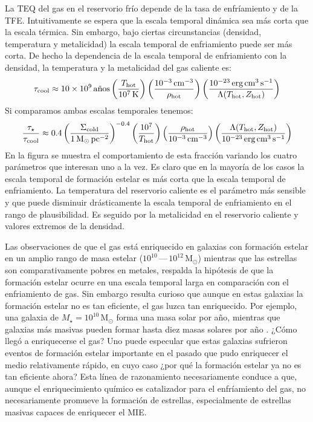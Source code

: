 \documentclass{article}
\begin{document}
\begin{description}
La TEQ del gas en el reservorio frío depende de la tasa de enfríamiento y de la TFE. Intuitivamente
se espera que la escala temporal dinámica sea más corta que la escala térmica. Sin embargo, bajo
ciertas circunstancias (densidad, temperatura y metalicidad) la escala temporal de enfriamiento
puede ser más corta.
De hecho la dependencia de la escala temporal de enfriamiento con la densidad, la temperatura y la
metalicidad del gas caliente es:
%
\begin{equation}
\tau_\text{cool}\approx10\times10^9\,\text{años}\left(\frac{T_\text{hot}}{10^7\,\text{K}}\right)\left(\frac{10^{-3}\,\text{cm}^{-3}}{\rho_\text{hot}}\right)\left(\frac{10^{-23}\,\text{erg\,cm}^{3}\,\text{s}^{-1}}{\Lambda(T_\text{hot},Z_\text{hot})}\right)
\end{equation}
%
Si comparamos ambas escalas temporales tenemos:
%
\begin{equation*}
\frac{\tau_\star}{\tau_\text{cool}} \approx 0.4\left(\frac{\Sigma_\text{cold}}{1\,\text{M}_\odot\,\text{pc}^{-2}}\right)^{-0.4}\left(\frac{10^7}{T_\text{hot}}\right)\left(\frac{\rho_\text{hot}}{10^{-3}\,\text{cm}^{-3}}\right)\left(\frac{\Lambda(T_\text{hot},Z_\text{hot})}{10^{-23}\,\text{erg\,cm}^{3}\,\text{s}^{-1}}\right)
\end{equation*}
%
En la figura se muestra el comportamiento de esta fracción variando los cuatro parámetros que
interesan uno a la vez. Es claro que en la mayoría de los casos la escala temporal de formación
estelar es más corta que la escala temporal de enfriamiento. La temperatura del reservorio caliente
es el parámetro más sensible y que puede disminuir drásticamente la escala temporal de enfriamiento
en el rango de plausibilidad. Es seguido por la metalicidad en el reservorio caliente y valores
extremos de la densidad.

Las observaciones de que el gas está enriquecido en galaxias con formación estelar en un amplio
rango de masa estelar ($10^{10}\,$---$\,10^{12}\,\text{M}_\odot$)
mientras que las estrellas son comparativamente pobres en metales, respalda la hipótesis de que la
formación estelar ocurre en una escala temporal larga en comparación con el enfriamiento de gas. Sin
embargo resulta curioso que aunque en estas galaxias la formación estelar no es tan eficiente, el
gas luzca tan enriquecido. Por ejemplo, una galaxia de $M_\star=10^{10}\,\text{M}_\odot$ forma una
masa solar por año, mientras que galaxias más masivas pueden formar hasta diez masas solares por año
\citep{Sanchez2013}. ¿Cómo llegó a enriquecerse el gas? Uno puede especular que estas galaxias
sufrieron eventos de formación estelar importante en el pasado que pudo enriquecer el medio
relativamente rápido, en cuyo caso ¿por qué la formación estelar ya no es tan eficiente ahora? Esta
línea de razonamiento necesariamente conduce a que, aunque el enriquecimiento químico es catalizador
para el enfríamiento del gas, no necesariamente promueve la formación de estrellas, especialmente de
estrellas masivas capaces de enriquecer el MIE.


\end{description}
\end{document}
